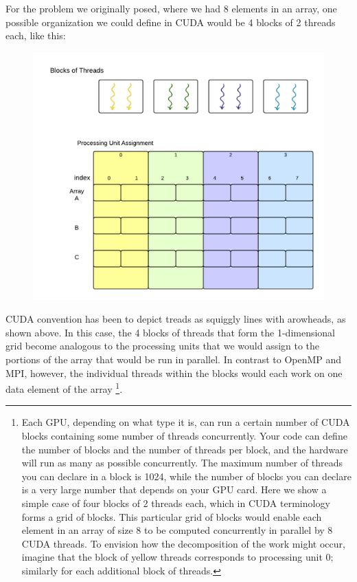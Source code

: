 \documentclass[letterpaper,10pt,openany,oneside]{sphinxmanual}
\begin{document}
For the problem we originally posed, where we had 8 elements in an array, one possible organization we could define in CUDA would be 4 blocks of 2 threads each, like this:
\begin{figure}[htbp]
\centering

\includegraphics{CUDABlocksThreads.png}
\end{figure}

CUDA convention has been to depict treads as squiggly lines with arowheads, as shown above. In this case, the 4 blocks of threads that form the 1-dimensional grid become analogous to the processing units that we would assign to the portions of the array that would be run in parallel.  In contrast to OpenMP and MPI, however, the individual threads within the blocks would each work on one data element of the array \footnote{
Each GPU, depending on what type it is, can run a certain number of CUDA blocks containing some number of threads concurrently.  Your code can define the number of blocks and the number of threads per block, and the hardware will run as many as possible concurrently.  The maximum number of threads you can declare in a block is 1024, while the number of blocks you can declare is a very large number that depends on your GPU card.  Here we show a simple case of four blocks of 2 threads each, which in CUDA terminology forms a grid of blocks.  This particular grid of blocks would enable each element in an array of size 8 to be computed concurrently in parallel by 8 CUDA threads. To envision how the decomposition of the work might occur, imagine that the block of yellow threads corresponds to processing unit 0; similarly for each additional block of threads.
}.
\end{document}
